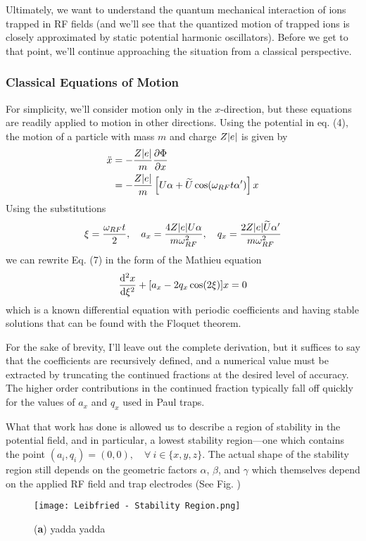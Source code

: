 Ultimately, we want to understand the quantum mechanical interaction of ions trapped in RF fields (and we'll see that the quantized motion of trapped ions is closely approximated by static potential harmonic oscillators). Before we get to that point, we'll continue approaching the situation from a classical perspective.
\subsubsection{Classical Equations of Motion}
For simplicity, we'll consider motion only in the $x$-direction, but these equations are readily applied to motion in other directions. Using the potential in eq. (4), the motion of a particle with mass $m$ and charge $Z\abs{e}$ is given by
\begin{align}
    \ddot{x} &= -\frac{Z\abs{e}}{m} \partialderivative{\Phi}{x}\\
    \nonumber&= -\frac{Z\abs{e}}{m} \left[ U\alpha + \widetilde{U} \cos(\omega_{RF} t \alpha')\right] x
\end{align}
Using the substitutions
\begin{equation}
    \xi = \frac{\omega_{RF} t}{2}, \quad a_x = \frac{4Z\abs{e} U\alpha}{m \omega_{RF}^2}, \quad q_x = \frac{2 Z\abs{e} \widetilde{U}\alpha'}{m \omega_{RF}^2}
\end{equation}
we can rewrite Eq. (7) in the form of the Mathieu equation
\begin{equation}
    \derivative{^2 x}{\xi^2} + [a_x - 2q_x \cos(2\xi)] x = 0
\end{equation}
which is a known differential equation with periodic coefficients and having stable solutions that can be found with the Floquet theorem. 

For the sake of brevity, I'll leave out the complete derivation, but it suffices to say that the coefficients are recursively defined, and a numerical value must be extracted by truncating the continued fractions at the desired level of accuracy. The higher order contributions in the continued fraction typically fall off quickly for the values of $a_x$ and $q_x$ used in Paul traps.

What that work has done is allowed us to describe a region of stability in the potential field, and in particular, a lowest stability region---one which contains the point $(a_i, q_i) = (0,0), \quad \forall \: i \in \{x, y, z\}$. The actual shape of the stability region still depends on the geometric factors $\alpha$, $\beta$, and $\gamma$ which themselves depend on the applied RF field and trap electrodes (See Fig. )
\begin{figure}[h]
    \texttt{[image: Leibfried - Stability Region.png]}
    \caption{(\textbf{a}) yadda yadda}
    \label{fig:Stability Region}
\end{figure}


